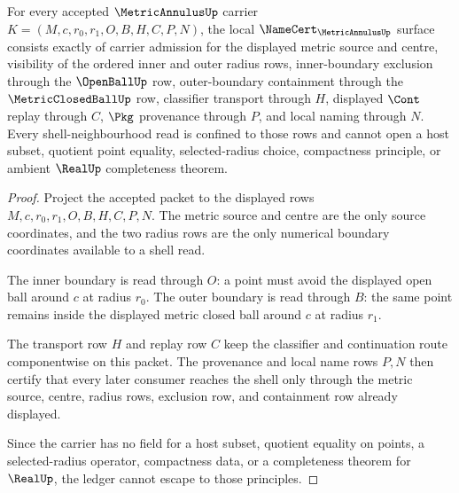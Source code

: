 \begin{theorem}
\label{thm:metric-annulus-namecert-obligations}
For every accepted $\MetricAnnulusUp$ carrier $K=(M,c,r_0,r_1,O,B,H,C,P,N)$, the local $\NameCert_{\MetricAnnulusUp}$ surface consists exactly of carrier admission for the displayed metric source and centre, visibility of the ordered inner and outer radius rows, inner-boundary exclusion through the $\OpenBallUp$ row, outer-boundary containment through the $\MetricClosedBallUp$ row, classifier transport through $H$, displayed $\Cont$ replay through $C$, $\Pkg$ provenance through $P$, and local naming through $N$. Every shell-neighbourhood read is confined to those rows and cannot open a host subset, quotient point equality, selected-radius choice, compactness principle, or ambient $\RealUp$ completeness theorem.
\end{theorem}
\begin{proof}
Project the accepted packet to the displayed rows $M,c,r_0,r_1,O,B,H,C,P,N$. The metric source and centre are the only source coordinates, and the two radius rows are the only numerical boundary coordinates available to a shell read.

The inner boundary is read through $O$: a point must avoid the displayed open ball around $c$ at radius $r_0$. The outer boundary is read through $B$: the same point remains inside the displayed metric closed ball around $c$ at radius $r_1$.

The transport row $H$ and replay row $C$ keep the classifier and continuation route componentwise on this packet. The provenance and local name rows $P,N$ then certify that every later consumer reaches the shell only through the metric source, centre, radius rows, exclusion row, and containment row already displayed.

Since the carrier has no field for a host subset, quotient equality on points, a selected-radius operator, compactness data, or a completeness theorem for $\RealUp$, the ledger cannot escape to those principles.
\end{proof}


